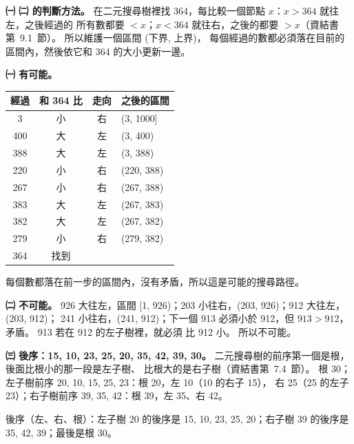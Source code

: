\begin{pastsoln}
\textbf{㈠ ㈡ 的判斷方法。} 在二元搜尋樹裡找 364，每比較一個節點 $x$：$x > 364$ 就往左，之後經過的
所有數都要 $< x$；$x < 364$ 就往右，之後的都要 $> x$（資結書第~9.1~節）。 所以維護一個區間 (下界, 上界)，
每個經過的數都必須落在目前的區間內，然後依它和 364 的大小更新一邊。

\textbf{㈠ 有可能。}
\begin{center}
\begin{tabular}{cccl}
\toprule
經過 & 和 364 比 & 走向 & 之後的區間 \\
\midrule
3 & 小 & 右 & (3, 1000] \\
400 & 大 & 左 & (3, 400) \\
388 & 大 & 左 & (3, 388) \\
220 & 小 & 右 & (220, 388) \\
267 & 小 & 右 & (267, 388) \\
383 & 大 & 左 & (267, 383) \\
382 & 大 & 左 & (267, 382) \\
279 & 小 & 右 & (279, 382) \\
364 & 找到 & & \\
\bottomrule
\end{tabular}
\end{center}
每個數都落在前一步的區間內，沒有矛盾，所以這是可能的搜尋路徑。

\textbf{㈡ 不可能。} 926 大往左，區間 [1, 926)；203 小往右，(203, 926)；912 大往左，(203, 912)；
241 小往右，(241, 912)；下一個 913 必須小於 912，但 $913 > 912$，矛盾。 913 若在 912 的左子樹裡，就必須
比 912 小。 所以不可能。

\textbf{㈢ 後序：15, 10, 23, 25, 20, 35, 42, 39, 30。} 二元搜尋樹的前序第一個是根，後面比根小的那一段是左子樹、
比根大的是右子樹（資結書第~7.4~節）。 根 30；左子樹前序 20, 10, 15, 25, 23：根 20，左 10（10 的右子 15），
右 25（25 的左子 23）；右子樹前序 39, 35, 42：根 39，左 35、右 42。
\begin{center}
\end{center}
後序（左、右、根）：左子樹 20 的後序是 15, 10, 23, 25, 20；右子樹 39 的後序是 35, 42, 39；最後是根 30。


\end{pastsoln}
